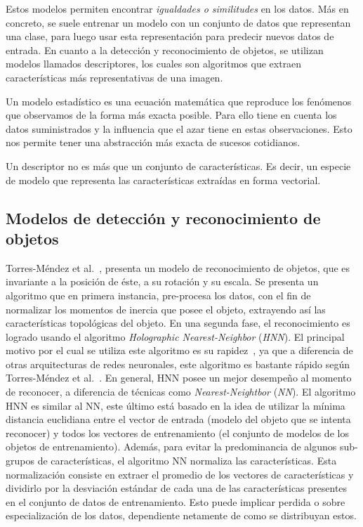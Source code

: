 Estos modelos permiten encontrar \textit{igualdades o similitudes} en los datos. Más en concreto, se suele entrenar un modelo con un conjunto de datos que representan una clase, para luego usar esta representación para predecir nuevos datos de entrada. En cuanto a la detección y reconocimiento de objetos, se utilizan modelos llamados descriptores, los cuales son algoritmos que extraen características más representativas de una imagen.

\begin{definition}\label{def:mod_est}
Un modelo estadístico es una ecuación matemática que reproduce los fenómenos que observamos de la forma más exacta posible. Para ello tiene en cuenta los datos suministrados y la influencia que el azar tiene en estas observaciones. Esto nos permite tener una abstracción más exacta de sucesos cotidianos.
\end{definition}
\begin{definition}[Descriptor]\label{def:desc}
Un descriptor no es más que un conjunto de características. Es decir, un especie de modelo que representa las características extraídas en forma vectorial.
\end{definition}


\subsection{Modelos de detección y reconocimiento de objetos}
Torres-Méndez et al.~\cite{trsi2000}, presenta un modelo de reconocimiento de objetos, que es invariante a la posición de éste, a su rotación y su escala. Se presenta un algoritmo que en primera instancia, pre-procesa los datos, con el fin de normalizar los momentos de inercia que posee el objeto, extrayendo así las características topológicas del objeto. En una segunda fase, el reconocimiento es logrado usando el algoritmo \textit{Holographic Nearest-Neighbor} (\textit{HNN}). El principal motivo por el cual se utiliza este algoritmo es su rapidez~\cite{trsi2000}, ya que a diferencia de otras arquitecturas de redes neuronales, este algoritmo es bastante rápido según Torres-Méndez et al.~\cite{trsi2000}. En general, HNN posee un mejor desempeño al momento de reconocer, a diferencia de técnicas como \textit{Nearest-Neightbor} (\textit{NN}). El algoritmo HNN es similar al NN, este último está basado en la idea de utilizar la mínima distancia euclidiana entre el vector de entrada (modelo del objeto que se intenta reconocer) y todos los vectores de entrenamiento (el conjunto de modelos de los objetos de entrenamiento). Además, para evitar la predominancia de algunos sub-grupos de características, el algoritmo NN normaliza las características. Esta normalización consiste en extraer el promedio de los vectores de características y dividirlo por la desviación estándar de cada una de las características presentes en el conjunto de datos de entrenamiento. Esto puede implicar perdida o sobre especialización de los datos, dependiente netamente de como se distribuyan estos.

